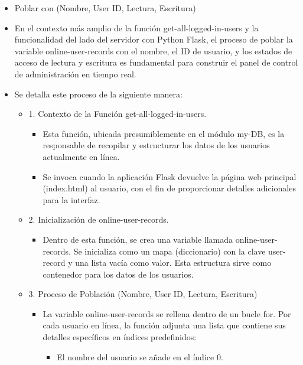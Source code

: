 \documentclass{report}
\begin{document}
\begin{itemize}
    \item Poblar con (Nombre, User ID, Lectura, Escritura)
    \item En el contexto más amplio de la función get-all-logged-in-users y la funcionalidad del lado del servidor con Python Flask, el proceso de poblar 
    la variable online-user-records con el nombre, el ID de usuario, y los estados de acceso de lectura y escritura es fundamental para construir el panel 
    de control de administración en tiempo real.
    \item Se detalla este proceso de la siguiente manera:
        \begin{itemize}
            \item 1. Contexto de la Función get-all-logged-in-users.
                \begin{itemize}
                    \item Esta función, ubicada presumiblemente en el módulo my-DB, es la responsable de recopilar y estructurar los datos de los usuarios 
                    actualmente en línea.
                    \item Se invoca cuando la aplicación Flask devuelve la página web principal (index.html) al usuario, con el fin de proporcionar detalles 
                    adicionales para la interfaz.
                \end{itemize}
            \item 2. Inicialización de online-user-records.
                \begin{itemize}
                    \item Dentro de esta función, se crea una variable llamada online-user-records. Se inicializa como un mapa (diccionario) con la clave 
                    user-record y una lista vacía como valor. Esta estructura sirve como contenedor para los datos de los usuarios.            
                \end{itemize}
            \item 3. Proceso de Población (Nombre, User ID, Lectura, Escritura)
                \begin{itemize}
                    \item La variable online-user-records se rellena dentro de un bucle for. Por cada usuario en línea, la función adjunta una lista 
                    que contiene sus detalles específicos en índices predefinidos:
                    \begin{itemize}
                        \item El nombre del usuario se añade en el índice 0.

\end{itemize}
\end{itemize}
\end{itemize}
\end{itemize}
\end{document}
